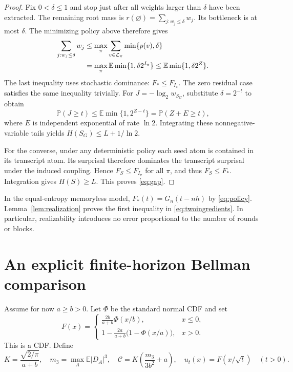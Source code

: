 \documentclass[11pt,a4paper]{article}
\newcommand{\E}{\mathbb E}
\newcommand{\Prob}{\mathbb P}
\begin{document}
\begin{proof}
Fix $0<\delta\le1$ and stop just after all weights larger than $\delta$
have been extracted. The remaining root mass is
$r(\varnothing)=\sum_{j:w_j\le\delta}w_j$. Its bottleneck is at most
$\delta$. The minimizing policy above therefore gives
\begin{align}
\sum_{j:w_j\le\delta}w_j
&\le\max_\pi\sum_{v\in\mathcal L_\pi}\min\{p(v),\delta\}\notag\\
&=\max_\pi\E\min\{1,\delta2^{I_\pi}\}
\le\E\min\{1,\delta2^Z\}.\label{eq:softtail}
\end{align}
The last inequality uses stochastic dominance: $F_*\le F_{I_\pi}$.
The zero residual case satisfies the same inequality trivially.
For $J=-\log_2w_{S_G}$, substitute $\delta=2^{-t}$ to obtain
\[
\Prob(J\ge t)\le\E\min\{1,2^{Z-t}\}
=\Prob(Z+E\ge t),
\]
where $E$ is independent exponential of rate $\ln2$. Integrating these
nonnegative-variable tails yields $H(S_G)\le L+1/\ln2$.

For the converse, under any deterministic policy each seed atom is
contained in its transcript atom. Its surprisal therefore dominates
the transcript surprisal under the induced coupling. Hence
$F_S\le F_{I_\pi}$ for all $\pi$, and thus $F_S\le F_*$. Integration
gives $H(S)\ge L$. This proves \eqref{eq:gap}.
\end{proof}

In the equal-entropy memoryless model, $F_*(t)=G_n(t-nh)$ by
\eqref{eq:policy}. Lemma~\ref{lem:realization} proves the first
inequality in \eqref{eq:twoingredients}. In particular, realizability
introduces no error proportional to the number of rounds or blocks.

\section{An explicit finite-horizon Bellman comparison}
Assume for now $a\ge b>0$. Let $\Phi$ be the standard normal CDF and set
\begin{equation}\label{eq:F}
F(x)=\begin{cases}
\displaystyle\frac{2b}{a+b}\Phi(x/b),&x\le0,\\[5pt]
\displaystyle1-\frac{2a}{a+b}\bigl(1-\Phi(x/a)\bigr),&x>0.
\end{cases}
\end{equation}
This is a CDF. Define
\[
K=\frac{\sqrt{2/\pi}}{a+b},\quad
m_3=\max_A\E|D_A|^3,\quad
\mathcal C=K\left(\frac{m_3}{3b^2}+a\right),\quad
u_t(x)=F(x/\sqrt t)\quad(t>0).
\]
\end{document}
